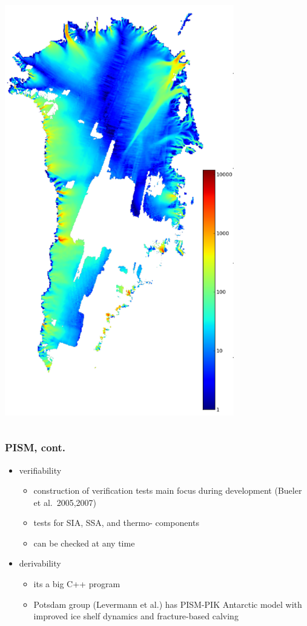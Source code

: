 \documentclass{beamer}
\begin{document}
\begin{frame}
\begin{columns}
\begin{column}{0.33\textwidth}
\begin{center}
  \includegraphics[width=0.75\textwidth]{joughin}
\end{center}
\end{column}
\end{columns}
\end{frame}


\begin{frame}
  \frametitle{PISM, cont.}

\begin{itemize}
\item verifiability
  \begin{itemize}
  \item construction of verification tests main focus during development (Bueler et al.~2005,2007)
  \item tests for SIA, SSA, and thermo- components
  \item can be checked at any time
  \end{itemize} 

\item derivability
  \begin{itemize}
  \item its a big C++ program
  \item Potsdam group (Levermann et al.) has PISM-PIK Antarctic model with improved ice shelf dynamics and fracture-based calving
  \end{itemize} 
\end{itemize} 
\end{frame}
\end{document}
